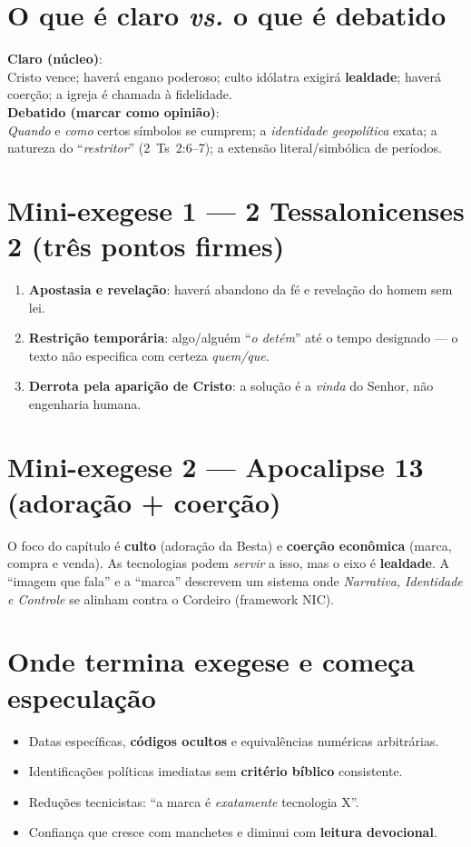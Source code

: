 \section{O que é claro \emph{vs.} o que é debatido}
\begin{nicbox}
\textbf{Claro (núcleo)}:\\
Cristo vence; haverá engano poderoso; culto idólatra exigirá \textbf{lealdade}; haverá coerção; a igreja é chamada à fidelidade.\\[0.5ex]
\textbf{Debatido (marcar como opinião)}:\\
\emph{Quando} e \emph{como} certos símbolos se cumprem; a \emph{identidade geopolítica} exata; a natureza do ``\emph{restritor}'' (2~Ts~2:6--7); a extensão literal/simbólica de períodos.
\end{nicbox}

\section{Mini-exegese 1 — 2 Tessalonicenses 2 (três pontos firmes)}
\begin{enumerate}[leftmargin=*,nosep]
  \item \textbf{Apostasia e revelação}: haverá abandono da fé e revelação do homem sem lei.
  \item \textbf{Restrição temporária}: algo/alguém ``\emph{o detém}'' até o tempo designado — o texto não especifica com certeza \emph{quem/que}.
  \item \textbf{Derrota pela aparição de Cristo}: a solução é a \emph{vinda} do Senhor, não engenharia humana.
\end{enumerate}

\section{Mini-exegese 2 — Apocalipse 13 (adoração + coerção)}
O foco do capítulo é \textbf{culto} (adoração da Besta) e \textbf{coerção econômica} (marca, compra e venda). As tecnologias podem \emph{servir} a isso, mas o eixo é \textbf{lealdade}. A ``imagem que fala'' e a ``marca'' descrevem um sistema onde \emph{Narrativa, Identidade e Controle} se alinham contra o Cordeiro (framework NIC).

\section{Onde termina exegese e começa especulação}
\begin{checklist}[title={Sinais de que você entrou em terreno opinativo}]
\begin{itemize}[leftmargin=*,noitemsep]
  \item Datas específicas, \textbf{códigos ocultos} e equivalências numéricas arbitrárias.
  \item Identificações políticas imediatas sem \textbf{critério bíblico} consistente.
  \item Reduções tecnicistas: ``a marca é \emph{exatamente} tecnologia X''.
  \item Confiança que cresce com manchetes e diminui com \textbf{leitura devocional}.
\end{itemize}
\end{checklist}

